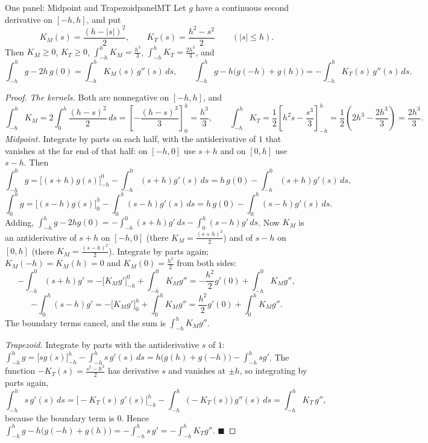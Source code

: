 \documentclass[11pt]{article}
\begin{document}
\begin{thm}{One panel: Midpoint and Trapezoid}{panelMT}
Let $g$ have a continuous second derivative on $[-h,h]$, and put
\[K_M(s)=\frac{(h-\lvert s\rvert)^2}2,\qquad K_T(s)=\frac{h^2-s^2}2\qquad(\lvert s\rvert\le h).\]
Then $K_M\ge0$, $K_T\ge0$, $\int_{-h}^hK_M=\frac{h^3}3$, $\int_{-h}^hK_T=\frac{2h^3}3$, and
\[\int_{-h}^hg-2h\,g(0)=\int_{-h}^hK_M(s)\,g''(s)\,ds,\qquad
\int_{-h}^hg-h\big(g(-h)+g(h)\big)=-\int_{-h}^hK_T(s)\,g''(s)\,ds.\]
\end{thm}
\begin{proof}
\emph{The kernels.} Both are nonnegative on $[-h,h]$, and
\[\int_{-h}^hK_M=2\int_0^h\frac{(h-s)^2}2\,ds=\left[-\frac{(h-s)^3}3\right]_0^h=\frac{h^3}3,\qquad
\int_{-h}^hK_T=\frac12\left[h^2s-\frac{s^3}3\right]_{-h}^{h}=\frac12\left(2h^3-\frac{2h^3}3\right)=\frac{2h^3}3.\]
\emph{Midpoint.} Integrate by parts on each half, with the antiderivative of $1$ that vanishes at the far end of that half: on $[-h,0]$ use $s+h$ and on $[0,h]$ use $s-h$. Then
\[\int_{-h}^0g=\Big[(s+h)g(s)\Big]_{-h}^0-\int_{-h}^0(s+h)g'(s)\,ds=h\,g(0)-\int_{-h}^0(s+h)g'(s)\,ds,\]
\[\int_0^hg=\Big[(s-h)g(s)\Big]_0^h-\int_0^h(s-h)g'(s)\,ds=h\,g(0)-\int_0^h(s-h)g'(s)\,ds.\]
Adding, $\int_{-h}^hg-2hg(0)=-\int_{-h}^0(s+h)g'\,ds-\int_0^h(s-h)g'\,ds$. Now $K_M$ is an antiderivative of $s+h$ on $[-h,0]$ (there $K_M=\frac{(s+h)^2}2$) and of $s-h$ on $[0,h]$ (there $K_M=\frac{(s-h)^2}2$). Integrate by parts again; $K_M(-h)=K_M(h)=0$ and $K_M(0)=\frac{h^2}2$ from both sides:
\[-\int_{-h}^0(s+h)g'=-\Big[K_Mg'\Big]_{-h}^0+\int_{-h}^0K_Mg''=-\frac{h^2}2g'(0)+\int_{-h}^0K_Mg'',\]
\[-\int_0^h(s-h)g'=-\Big[K_Mg'\Big]_0^h+\int_0^hK_Mg''=\frac{h^2}2g'(0)+\int_0^hK_Mg''.\]
The boundary terms cancel, and the sum is $\int_{-h}^hK_Mg''$.

\emph{Trapezoid.} Integrate by parts with the antiderivative $s$ of $1$: $\int_{-h}^hg=\big[sg(s)\big]_{-h}^h-\int_{-h}^hs\,g'(s)\,ds=h\big(g(h)+g(-h)\big)-\int_{-h}^hsg'$. The function $-K_T(s)=\frac{s^2-h^2}2$ has derivative $s$ and vanishes at $\pm h$, so integrating by parts again,
\[\int_{-h}^hs\,g'(s)\,ds=\Big[-K_T(s)\,g'(s)\Big]_{-h}^h-\int_{-h}^h\big(-K_T(s)\big)\,g''(s)\,ds=\int_{-h}^hK_T\,g'',\]
because the boundary term is $0$. Hence $\int_{-h}^hg-h\big(g(-h)+g(h)\big)=-\int_{-h}^hs\,g'=-\int_{-h}^hK_Tg''$. $\blacksquare$
\end{proof}
\end{document}
